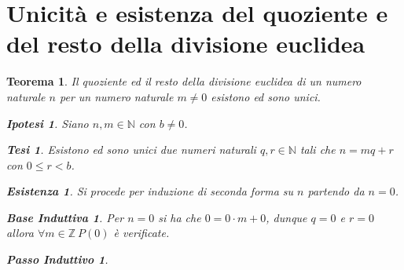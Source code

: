 \documentclass{article}
\makeatletter
\renewenvironment{proof}[1][\proofname]{\par
    \pushQED{\qed}%
    \normalfont \topsep6\p@\@plus6\p@\relax
    \trivlist
    \item\relax
    {\itshape
    #1\@addpunct{.}}\hspace\labelsep\ignorespaces
    }{%
    \popQED\endtrivlist\@endpefalse
}
\newtheorem{theorem}{Teorema}[part]
\newtheorem{ipothesis}[lemma]{Ipotesi}
\newtheorem{thesis}[lemma]{Tesi}
\newtheorem*{existence}{Esistenza}
\newtheorem*{base}{Base Induttiva}
\newtheorem*{step}{Passo Induttivo}
\makeatother
\begin{document}
\section{Unicità e esistenza del quoziente e del resto della divisione euclidea}
\begin{theorem}
    Il quoziente ed il resto della divisione euclidea di un numero naturale \(n\) per un numero naturale \(m\neq 0\) esistono ed sono unici.
    \begin{ipothesis}
        Siano \(n,m\in\mathbb{N}\) con \(b\neq 0\).
    \end{ipothesis}
    \begin{thesis}
        Esistono ed sono unici due numeri naturali \(q,r\in\mathbb{N}\) tali che \(n=mq+r\) con \(0\leq r<b\).
    \end{thesis}
    \begin{proof}
        \begin{existence}
            Si procede per induzione di seconda forma su \(n\) partendo da \(n=0\).
            \begin{base}
                Per \(n=0\) si ha che \(0=0\cdot m+0\), dunque \(q=0\) e \(r=0\) allora \(\forall m\in\mathbb{Z}\ P(0)\) è verificate.
            \end{base}
            \begin{step}
                

\end{step}
\end{existence}
\end{proof}
\end{theorem}
\end{document}

